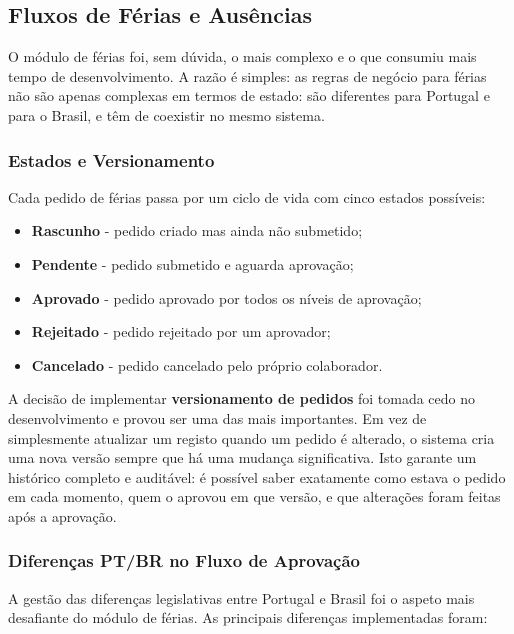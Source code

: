 \documentclass[12pt, a4paper, twoside, openright]{report}
\begin{document}
\subsection{Fluxos de Férias e Ausências}
\label{subsec:ferias}

O módulo de férias foi, sem dúvida, o mais complexo e o que consumiu mais tempo de
desenvolvimento. A razão é simples: as regras de negócio para férias não são apenas
complexas em termos de estado: são diferentes para Portugal e para o Brasil, e
têm de coexistir no mesmo sistema.

\subsubsection{Estados e Versionamento}

Cada pedido de férias passa por um ciclo de vida com cinco estados possíveis:

\begin{itemize}
  \item \textbf{Rascunho} - pedido criado mas ainda não submetido;
  \item \textbf{Pendente} - pedido submetido e aguarda aprovação;
  \item \textbf{Aprovado} - pedido aprovado por todos os níveis de aprovação;
  \item \textbf{Rejeitado} - pedido rejeitado por um aprovador;
  \item \textbf{Cancelado} - pedido cancelado pelo próprio colaborador.
\end{itemize}

A decisão de implementar \textbf{versionamento de pedidos} foi tomada cedo no
desenvolvimento e provou ser uma das mais importantes. Em vez de simplesmente
atualizar um registo quando um pedido é alterado, o sistema cria uma nova versão
sempre que há uma mudança significativa. Isto garante um histórico completo e
auditável: é possível saber exatamente como estava o pedido em cada momento, quem
o aprovou em que versão, e que alterações foram feitas após a aprovação.

\subsubsection{Diferenças PT/BR no Fluxo de Aprovação}

A gestão das diferenças legislativas entre Portugal e Brasil foi o aspeto mais
desafiante do módulo de férias. As principais diferenças implementadas foram:
\end{document}
